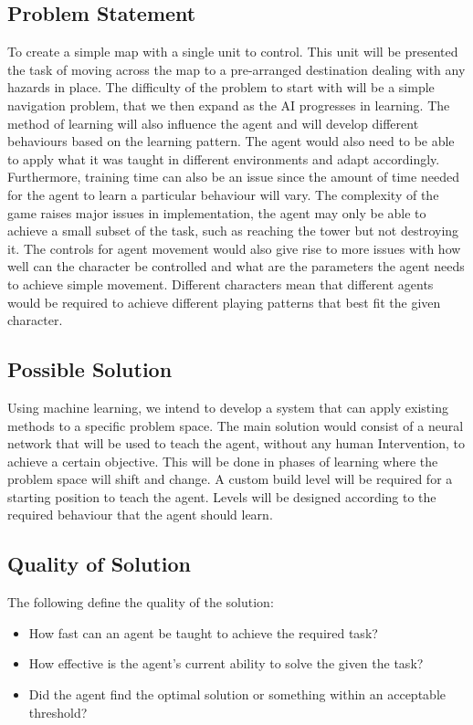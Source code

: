\documentclass[12pt]{article}
\begin{document}
\subsection{Problem Statement}

To create a simple map with a single unit to control.
This unit will be presented the task of moving across the map to a
pre-arranged destination dealing with any hazards in place.
The difficulty of the problem to start with will be a simple navigation
problem, that we then expand as the AI progresses in learning. The
method of learning will also influence the agent and will develop different
behaviours based on the learning pattern. The agent would also need to be
able to apply what it was taught in different environments and adapt
accordingly. Furthermore, training time can also be an issue since the
amount of time needed for the agent to learn a particular behaviour will vary.
The complexity of the game raises major issues in implementation, the agent
may only be able to achieve a small subset of the task, such as reaching the
tower but not destroying it. The controls for agent movement would also give rise
to more issues with how well can the character be controlled and what are the
parameters the agent needs to achieve simple movement.
Different characters mean that different agents would be required to
achieve different playing patterns that best fit the given character.

\subsection{Possible Solution}

Using machine learning, we intend to develop a system that can
apply existing methods to a specific problem space. The main
solution would consist of a neural network that will be used to
teach the agent, without any human Intervention, to achieve a
certain objective. This will be done in phases of learning where
the problem space will shift and change. A custom build level will
be required for a starting position to teach the agent.
Levels will be designed according to the required behaviour
that the agent should learn.

\subsection{Quality of Solution}
The following define the quality of the solution:
\begin{itemize}
    \item How fast can an agent be taught to achieve the required task?
    \item How effective is the agent’s current ability to solve
          the given the task?
    \item Did the agent find the optimal solution or something
          within an acceptable threshold?
\end{itemize}
\end{document}
